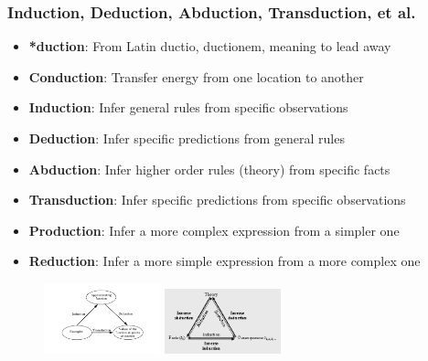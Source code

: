 \documentclass{beamer}
\begin{document}
  \begin{frame}
    \frametitle{Induction, Deduction, Abduction, Transduction, et al.}
    \begin{itemize}
      \item \textbf{*duction}: From Latin ductio, ductionem, meaning to lead away
      \item \textbf{Conduction}: Transfer energy from one location to another
      \item \textbf{Induction}: Infer general rules from specific observations
      \item \textbf{Deduction}: Infer specific predictions from general rules
      \item \textbf{Abduction}: Infer higher order rules (theory) from specific facts
      \item \textbf{Transduction}: Infer specific predictions from specific observations
      \item \textbf{Production}: Infer a more complex expression from a simpler one
      \item \textbf{Reduction}: Infer a more simple expression from a more complex one
    \end{itemize}
    \begin{figure}[H]
      \centering
      \includegraphics[width=0.3\textwidth]{../clipart/induction_deduction_transduction.png}
      \includegraphics[width=0.3\textwidth]{../clipart/induction_deduction_abduction.png}
    \end{figure}
  \end{frame}
\end{document}
